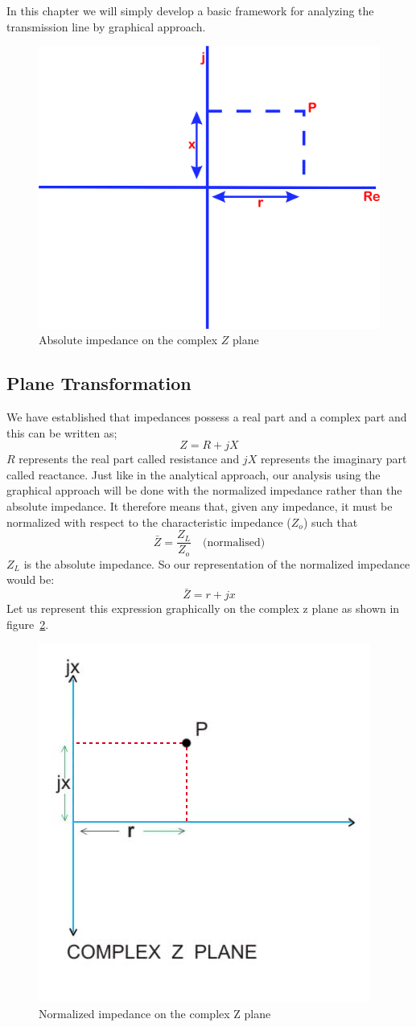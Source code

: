 In this chapter we will simply develop a basic framework for analyzing the transmission line by graphical approach.
\begin{figure}[h]
\centering
\includegraphics[width=0.5\linewidth]{./graphics/mjhdj}
\caption{Absolute impedance on the complex $Z$ plane}
\label{fig:mjhdj}
\end{figure}

\subsection{Plane Transformation}
We have established that impedances possess a real part and a complex part and this can be written as;
\begin{equation*}
Z= R+jX
\end{equation*}
$R$  represents the real part called resistance and $jX$ represents the imaginary part called reactance. Just like in the analytical approach, our analysis using the graphical approach will be done with the normalized impedance rather than the absolute impedance. It therefore means that, given any impedance, it must be normalized with respect to the characteristic impedance ($Z_o$) such that
\begin{equation*}
\bar{Z}=\frac{Z_L}{Z_o} \quad \text{(normalised)}
\end{equation*}
$Z_L$ is the absolute  impedance. So our representation of the normalized impedance would be:
\begin{equation*}
\bar{Z}= r + jx
\end{equation*}
Let us represent this expression graphically on the complex z plane as shown in figure~\ref{fig:transline2}.
\begin{figure}[h]
\center\includegraphics[width=0.5\linewidth]{./graphics/TransLine2 RETOUCHED}
\caption{Normalized impedance on the complex Z plane}
\label{fig:transline2}
\end{figure}

